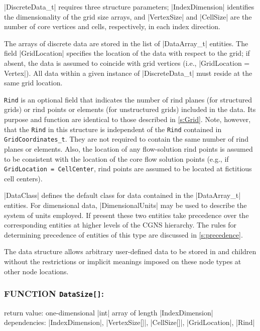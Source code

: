 |DiscreteData_t| requires three structure parameters; |IndexDimension|
identifies the dimensionality of the grid size arrays, and |VertexSize|
and |CellSize| are the number of core vertices and cells, respectively,
in each index direction.

The arrays of discrete data are stored in the list of |DataArray_t|
entities.
The field |GridLocation| specifies the location of the data with respect
to the grid; if absent, the data is assumed to coincide with grid
vertices (i.e., |GridLocation = Vertex|).
All data within a given instance of |DiscreteData_t| must reside at the
same grid location.

\texttt{Rind} is an optional field that indicates
the number of rind planes (for structured grids) or rind points or
elements (for unstructured grids) included in the data.
Its purpose and function are identical to those described in
\autoref{s:Grid}.
Note, however, that the \texttt{Rind} in this structure is independent
of the \texttt{Rind} contained in \texttt{GridCoordinates\_t}.
They are not required to contain the same number of rind planes or
elements.
Also, the location of any flow-solution rind points is assumed to be
consistent with the location of the core flow solution points (e.g.,
if \texttt{GridLocation = CellCenter}, rind points are assumed to be
located at fictitious cell centers).

|DataClass| defines the default class for data contained in the
|DataArray_t| entities.
For dimensional data, |DimensionalUnits| may be used to describe the
system of units employed.
If present these two entities take precedence over the corresponding
entities at higher levels of the CGNS hierarchy.
The rules for determining precedence of entities of this type are
discussed in \autoref{s:precedence}.

The  data structure allows arbitrary
user-defined data to be stored in  and
 children without the restrictions or implicit
meanings imposed on these node types at other node locations.

\subsubsection*{FUNCTION \texttt{DataSize[]}:}

\noindent return value: one-dimensional |int| array of length
          |IndexDimension| \\
\noindent dependencies: |IndexDimension|, |VertexSize[]|, |CellSize[]|,
          |GridLocation|, |Rind|

